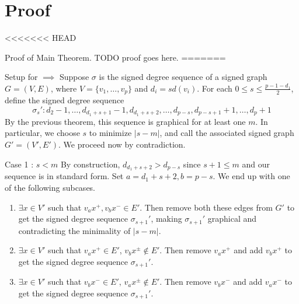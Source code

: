 \section{Proof}

<<<<<<< HEAD
\begin{frame}{Proof of Main Theorem.}
	TODO proof goes here.
=======
\begin{frame}{Setup for $\implies$}
	Suppose $\sigma$ is the signed degree sequence of a signed graph $G = (V,E)$, where $V = \{v_1,\dots,v_p\}$ and $d_i = sd(v_i)$. For each $0 \leq s \leq \frac{p-1-d_1}{2}$, define the signed degree sequence
	\begin{equation*}
		\sigma_s' : d_2-1,\dots,d_{d_1+s+1}-1,d_{d_1+s+2},\dots,d_{p-s},d_{p-s+1}+1,\dots,d_p+1
	\end{equation*}
	By the previous theorem, this sequence is graphical for at least one $m$. In particular, we choose $s$ to minimize $|s-m|$, and call the associated signed graph $G' = (V',E')$. We proceed now by contradiction.
\end{frame}

\begin{frame}{Case 1 : $s < m$}
	By construction, $d_{d_1+s+2} > d_{p-s}$ since $s+1 \leq m$ and our sequence is in standard form. Set $a = d_1+s+2, b = p - s$. We end up with one of the following subcases.
	\begin{enumerate}
		\item $\exists x \in V'$ such that $v_ax^{+}, v_bx^{-} \in E'$. Then remove both these edges from $G'$ to get the signed degree sequence $\sigma_{s+1}'$, making $\sigma_{s+1}'$ graphical and contradicting the minimality of $|s - m|$.
		\item $\exists x \in V'$ such that $v_ax^{+} \in E'$, $v_bx^{\pm} \notin E'$. Then remove $v_ax^{+}$ and add $v_bx^{+}$ to get the signed degree sequence $\sigma_{s+1}'$.
		\item $\exists x \in V'$ such that $v_bx^{-} \in E'$, $v_ax^{\pm} \notin E'$. Then remove $v_bx^{-}$ and add $v_ax^{-}$ to get the signed degree sequence $\sigma_{s+1}'$.
	\end{enumerate}
\end{frame}


\end{frame}
